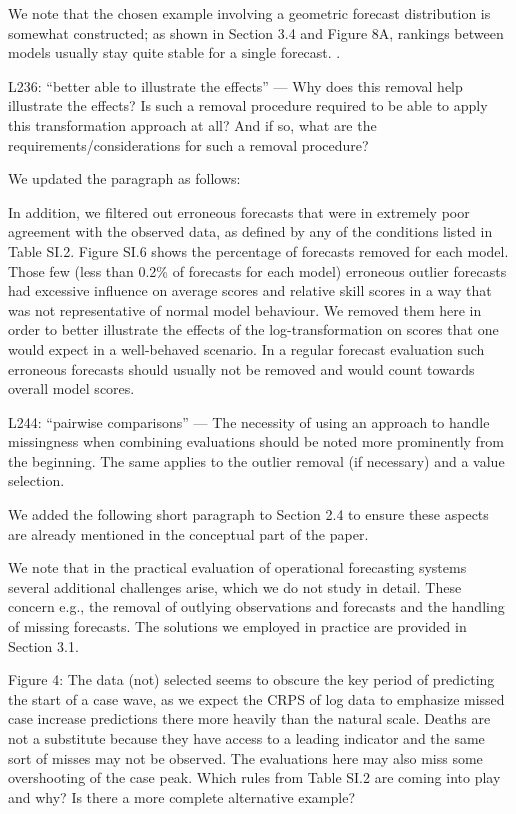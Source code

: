 \documentclass{article}
\newcommand{\black}{\color{black}}
\newcommand{\blue}{\color{blue}}
\newcommand{\indented}{\setlength{\leftskip}{1cm}}
\newcommand{\notindented}{\setlength{\leftskip}{0cm}}
\begin{document}
\indented
We note that the chosen example involving a geometric forecast distribution is somewhat constructed; as shown in Section 3.4 and Figure 8A, rankings between models usually stay quite stable for a single forecast. .

\notindented


\blue
L236: “better able to illustrate the effects” — Why does this removal help illustrate the effects? Is such a removal procedure required to be able to apply this transformation approach at all? And if so, what are the requirements/considerations for such a removal procedure?

\black
We updated the paragraph as follows: 

\indented
In addition, we filtered out erroneous forecasts that were in extremely poor agreement with the observed data, as defined by any of the conditions listed in Table SI.2. Figure SI.6 shows the percentage of forecasts removed for each model. Those few (less than 0.2\%  of forecasts for each model) erroneous outlier forecasts had excessive influence on average scores and relative skill scores in a way that was not representative of normal model behaviour. We removed them here in order to better illustrate the effects of the log-transformation on scores that one would expect in a well-behaved scenario. In a regular forecast evaluation such erroneous forecasts should usually not be removed and would count towards overall model scores.

\notindented

\blue
L244: “pairwise comparisons” — The necessity of using an approach to handle missingness when combining evaluations should be noted more prominently from the beginning. The same applies to the outlier removal (if necessary) and a value selection.

\black
We added the following short paragraph to Section 2.4 to ensure these aspects are already mentioned in the conceptual part of the paper.

\indented
We note that in the practical evaluation of operational forecasting systems  several additional challenges arise, which we do not study in detail. These concern e.g., the removal of outlying observations and forecasts and the handling of missing forecasts. The solutions we employed in practice are provided in Section 3.1.

\notindented



\blue
Figure 4: The data (not) selected seems to obscure the key period of predicting the start of a case wave, as we expect the CRPS of log data to emphasize missed case increase predictions there more heavily than the natural scale. Deaths are not a substitute because they have access to a leading indicator and the same sort of misses may not be observed. The evaluations here may also miss some overshooting of the case peak. Which rules from Table SI.2 are coming into play and why? Is there a more complete alternative example?
\end{document}
